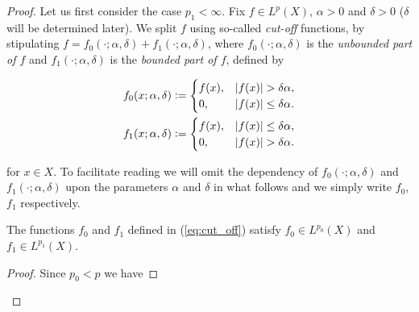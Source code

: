 \begin{proof}
Let us first consider the case \underline{$p_1 < \infty$}. Fix $f \in L^p(X)$, $\alpha > 0$ and $\delta > 0$ ($\delta$ will be determined later). We split $f$ using so-called \emph{cut-off} functions, by stipulating $f = f_0(\cdot;\alpha,\delta) + f_1(\cdot;\alpha,\delta)$, where $f_0(\cdot;\alpha,\delta)$ is the \emph{unbounded part of $f$} and $f_1(\cdot;\alpha,\delta)$ is the \emph{bounded part of $f$}, defined by

\begin{gather}
	\begin{aligned}
		f_0(x;\alpha,\delta) &:= \begin{cases}
		f(x), & \abs[0]{ f(x)} > \delta \alpha,\\
		0, & \abs[0]{ f(x)} \leq \delta \alpha.
		\end{cases}\\
		f_1(x;\alpha,\delta) &:= \begin{cases}
			f(x), & \abs[0]{ f(x) } \leq \delta \alpha,\\
		0, & \abs[0]{ f(x)} > \delta \alpha.
		\end{cases}
	\end{aligned}
	\label{eq:cut_off}
\end{gather}

\noindent for $x \in X$. To facilitate reading we will omit the dependency of $f_0(\cdot;\alpha,\delta)$ and $f_1(\cdot;\alpha,\delta)$ upon the parameters $\alpha$ and $\delta$ in what follows and we simply write $f_0$, $f_1$ respectively. 
	
\begin{lemma}
	The functions $f_0$ and $f_1$ defined in \textup{(\ref{eq:cut_off})} satisfy $f_0 \in L^{p_0}(X)$ and $f_1 \in L^{p_1}(X)$.
	\label{lem:f0f1}
\end{lemma}
	
\begin{proof}
Since $p_0 < p$ we have 


\end{proof}
\end{proof}
